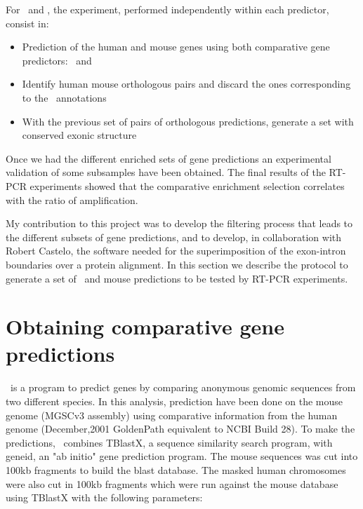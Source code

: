 For \sgp\ and \twinscan, the experiment, performed independently
within each predictor, consist in:

\begin{itemize}

\item Prediction of the human and mouse genes using both comparative 
gene predictors: \sgp\ and \twinscan

\item Identify human mouse orthologous pairs and discard the 
ones corresponding to the \ensembl\ annotations 

\item With the previous set of pairs of orthologous predictions, 
generate a set with conserved exonic structure

\end{itemize}

Once we had the different enriched sets of gene predictions an
experimental validation of some subsamples have been obtained. The
final results of the RT-PCR experiments showed that the comparative
enrichment selection correlates with the ratio of amplification.

My contribution to this project was to develop the filtering
process that leads to the different subsets of gene predictions, and
to develop, in collaboration with Robert Castelo, the software needed
for the superimposition of the exon-intron boundaries over a protein
alignment. In this section we describe the protocol to generate a set
of \sgp\ and \twinscan mouse predictions to be tested by RT-PCR
experiments.

\section{Obtaining comparative gene predictions}

\sgp\ is a program to predict genes by comparing anonymous genomic
sequences from two different species. In this analysis, prediction have
been done on the mouse genome (MGSCv3 assembly) using comparative
information from the human genome (December,2001 GoldenPath equivalent
to NCBI Build 28). To make the predictions, \sgp\ combines TBlastX, a
sequence similarity search program, with geneid, an "ab initio" gene
prediction program. The mouse sequences was cut into 100kb fragments
to build the blast database. The masked human chromosomes were also
cut in 100kb fragments which were run against the mouse database using
TBlastX with the following parameters:


